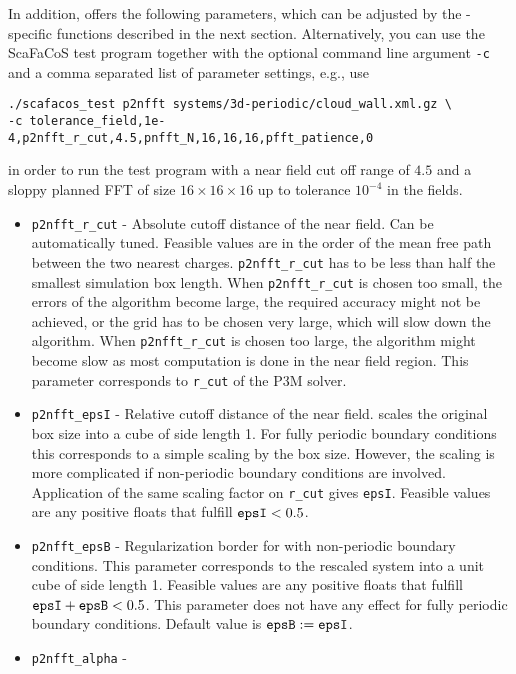 In addition, \ptwonfft offers the following parameters, which can be adjusted by the \ptwonfft-specific functions described in the next section.
Alternatively, you can use the ScaFaCoS test program together with the optional command line argument \verb!-c! and a comma separated list
of parameter settings, e.g., use
\begin{verbatim}
./scafacos_test p2nfft systems/3d-periodic/cloud_wall.xml.gz \
-c tolerance_field,1e-4,p2nfft_r_cut,4.5,pnfft_N,16,16,16,pfft_patience,0
\end{verbatim}
in order to run the test program with a near field cut off range of $4.5$ and a sloppy planned FFT of size $16\times 16 \times 16$ up to tolerance $10^{-4}$ in the fields.
\begin{itemize}
  \item \verb!p2nfft_r_cut! -
    Absolute cutoff distance of the near field. Can be
    automatically tuned. Feasible values are in the order of the mean
    free path between the two nearest charges.
    \verb!p2nfft_r_cut! has to be less than half the
    smallest simulation box length.  When \verb!p2nfft_r_cut! is chosen too
    small, the errors of the algorithm become large, the required
    accuracy might not be achieved, or the grid has to be chosen very
    large, which will slow down the algorithm.  When \verb!p2nfft_r_cut! is
    chosen too large, the algorithm might become slow as most
    computation is done in the near field region.
    This parameter corresponds to \verb!r_cut! of the P3M solver.
  \item \verb!p2nfft_epsI! -
    Relative cutoff distance of the near field. \ptwonfft scales the original box size into a cube of side length 1.
    For fully periodic boundary conditions this corresponds to a simple scaling by the box size. However, the scaling is more complicated if non-periodic
    boundary conditions are involved. Application of the same scaling factor on \verb!r_cut! gives \verb!epsI!.
    Feasible values are any positive floats that fulfill $\verb!epsI! < 0.5$.
  \item \verb!p2nfft_epsB! -
    Regularization border for \ptwonfft with non-periodic boundary conditions. This parameter corresponds to the rescaled system into a unit cube of side length 1.
    Feasible values are any positive floats that fulfill $\verb!epsI! + \verb!epsB! < 0.5$.
    This parameter does not have any effect for fully periodic boundary conditions. Default value is $\verb!epsB! := \verb!epsI!$.
  \item \verb!p2nfft_alpha! -

\end{itemize}

